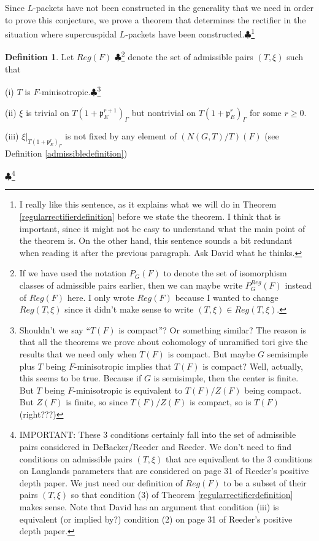\documentclass[11pt]{amsart}
\theoremstyle{plain}
\newcommand{\MAxxx}[1]{$\clubsuit$\footnote{#1}}
\theoremstyle{definition}
\newtheorem{definition}[theorem]{Definition}
\begin{document}
Since $L$-packets have not been constructed in the generality that
we need in order to prove this conjecture, we prove a theorem that determines
the rectifier in the situation where supercuspidal $L$-packets have been
constructed.\MAxxx{I really like this sentence, as it explains what we will do
in Theorem \ref{regularrectifierdefinition} before we state the theorem. I think
that is important, since it might not be easy to understand what the main
point of the theorem is.  On the other hand, this sentence sounds a bit
redundant when reading it after the previous paragraph.  Ask David what
he thinks.}

\begin{definition}\label{regularpairs}
Let $Reg(F)$ \MAxxx{If we have used the notation $P_G(F)$ to denote
the set of isomorphism classes of admissible pairs earlier, then we can maybe
write $P_G^{Reg}(F)$ instead of $Reg(F)$ here.  I only wrote $Reg(F)$ because
I wanted to change $Reg(T,\xi)$ since it didn't make sense to write
$(T,\xi) \in Reg(T,\xi)$.} denote the set of admissible pairs $(T,\xi)$ such that

(i) $T$ is $F$-minisotropic.\MAxxx{Shouldn't we say ``$T(F)$ is compact''?  Or something
similar?  The reason is that all the theorems we prove about cohomology of unramified tori
give the results that we need only when $T(F)$ is compact.  But maybe $G$ semisimple plus
$T$ being $F$-minisotropic implies that $T(F)$ is compact?  Well, actually, this seems
to be true. Because if $G$ is semisimple, then the center is finite.  But $T$ being
$F$-minisotropic is equivalent to $T(F) / Z(F)$ being compact.  But $Z(F)$ is finite, so
since $T(F) / Z(F)$ is compact, so is $T(F)$  (right???)}

(ii) $\xi$ is trivial on $T(1+\mathfrak{p}_E^{r+1})_{\Gamma}$ but nontrivial on
$T(1+\mathfrak{p}_E^{r})_{\Gamma}$ for some $r \geq 0$.

(iii) $\xi|_{T(1+\mathfrak{p}_E^{r})_{\Gamma}}$ is not fixed by any element of
$(N(G,T)/T)(F)$ (see Definition \ref{admissibledefinition})
\end{definition}
\MAxxx{IMPORTANT: These 3 conditions certainly fall into the set of admissible pairs considered in DeBacker/Reeder and Reeder.  We don't need to find conditions on admissible pairs $(T,\xi)$ that are equivallent to the 3 conditions on Langlands parameters that are considered on page 31 of Reeder's positive depth paper.  We just need our definition of $Reg(F)$ to be a subset of their pairs $(T,\xi)$ so that condition (3) of Theorem \ref{regularrectifierdefinition} makes sense. Note that David has an argument that condition (iii) is equivalent (or implied by?) condition (2) on page 31 of Reeder's positive depth paper.}
\end{document}
